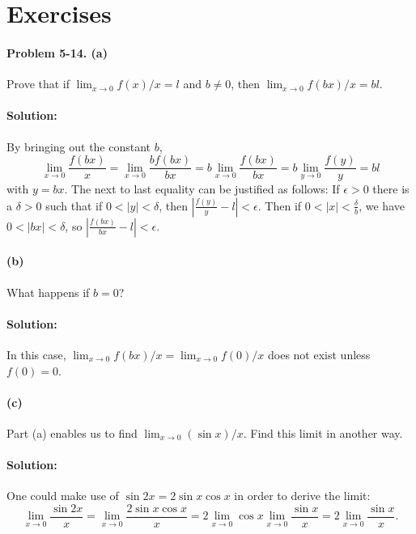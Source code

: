 \documentclass{article}
\begin{document}
\section*{Exercises}

\paragraph{Problem 5-14. (a)} Prove that if $\lim_{x \rightarrow 0} f(x)/x = l$
and $b \neq 0$, then $\lim_{x \rightarrow 0}f(bx)/x = bl$.

\paragraph{Solution:} By bringing out the constant $b$, \begin{equation*}
  \lim_{x \rightarrow 0}\frac{f(bx)}{x} = \lim_{x \rightarrow 0}
    \frac{bf(bx)}{bx} = b\lim_{x \rightarrow 0}\frac{f(bx)}{bx} =
    b\lim_{y \rightarrow 0}\frac{f(y)}{y} = bl
\end{equation*} with $y = bx$.
The next to last equality can be justified as follows: If $\epsilon > 0$ there
is a $\delta > 0$ such that if $0 < |y| < \delta$, then $\left|\frac{f(y)}{y} -
l\right| < \epsilon$. Then if $0 < |x| < \frac{\delta}{b}$, we have $0 < |bx| <
\delta$, so $\left|\frac{f(bx)}{bx} - l\right| < \epsilon$.

\paragraph{(b)} What happens if $b = 0$?

\paragraph{Solution:} In this case, $\lim_{x \rightarrow 0} f(bx)/x = \lim_{x
\rightarrow 0} f(0)/x$ does not exist unless $f(0) = 0$.

\paragraph{(c)} Part (a) enables us to find $\lim_{x \rightarrow 0}
(\sin{x})/x$. Find this limit in another way.

\paragraph{Solution:} One could make use of $\sin{2x} = 2\sin{x}\cos{x}$ in
order to derive the limit: \begin{equation*}
  \lim_{x \rightarrow 0}\frac{\sin{2x}}{x} = \lim_{x \rightarrow 0}\frac{2
    \sin{x}\cos{x}}{x} = 2\lim_{x \rightarrow 0}\cos{x}\lim_{x \rightarrow 0}
    \frac{\sin{x}}{x} = 2\lim_{x \rightarrow 0}\frac{\sin{x}}{x}.
\end{equation*}
\end{document}
